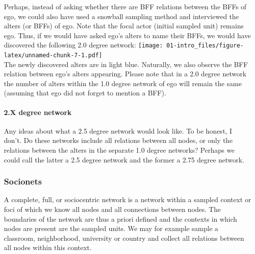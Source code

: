 \documentclass[
]{book}
\begin{document}
Perhaps, instead of asking whether there are BFF relations between the BFFs of ego, we could also have used a snowball sampling method and interviewed the alters (or BFFs) of ego. Note that the focal actor (initial sampled unit) remains ego.
Thus, if we would have asked ego's alters to name their BFFs, we would have discovered the following 2.0 degree network:
\texttt{[image: 01-intro\_files/figure-latex/unnamed-chunk-7-1.pdf]}\\
The newly discovered alters are in light blue. Naturally, we also observe the BFF relation between ego's alters appearing. Please note that in a 2.0 degree network the number of alters within the 1.0 degree network of ego will remain the same (assuming that ego did not forget to mention a BFF).

\hypertarget{x-degree-network}{%
\paragraph{2.X degree network}\label{x-degree-network}}

Any ideas about what a 2.5 degree network would look like. To be honest, I don't. Do these networks include all relations between all nodes, or only the relations between the alters in the separate 1.0 degree networks? Perhaps we could call the latter a 2.5 degree network and the former a 2.75 degree network.

\hypertarget{socionets}{%
\subsubsection*{\texorpdfstring{\textbf{Socionets}}{Socionets}}\label{socionets}}

A complete, full, or sociocentric network is a network within a sampled context or foci of which we know all nodes and all connections between nodes. The boundaries of the network are thus a priori defined and the contexts in which nodes are present are the sampled units.
We may for example sample a classroom, neighborhood, university or country and collect all relations between all nodes within this context.
\end{document}

